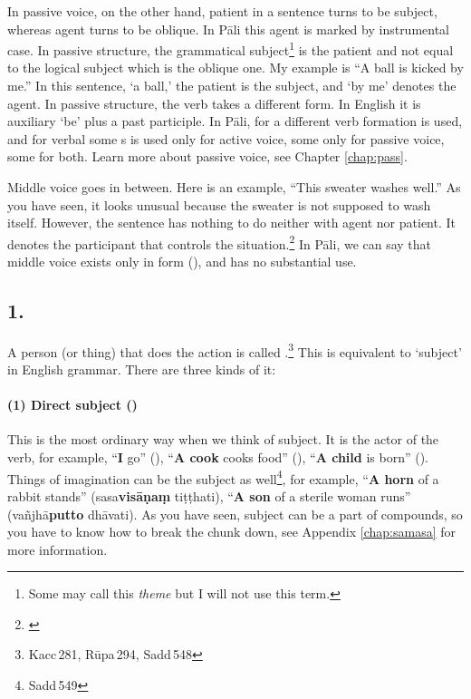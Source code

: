 In passive voice, on the other hand, patient in a sentence turns to be subject, whereas agent turns to be oblique. In P\=ali this agent is marked by instrumental case. In passive structure, the grammatical subject\footnote{Some may call this \emph{theme} but I will not use this term.} is the patient and not equal to the logical subject which is the oblique one. My example is ``A ball is kicked by me.'' In this sentence, `a ball,' the patient is the subject, and `by me' denotes the agent. In passive structure, the verb takes a different form. In English it is auxiliary `be' plus a past participle. In P\=ali, for  a different verb formation is used, and for verbal  some s is used only for active voice, some only for passive voice, some for both. Learn more about passive voice, see Chapter \ref{chap:pass}.

Middle voice goes in between. Here is an example, ``This sweater washes well.'' As you have seen, it looks unusual because the sweater is not supposed to wash itself. However, the sentence has nothing to do neither with agent nor patient. It denotes the participant that controls the situation.\footnote{\citealp[p.~467]{brownmiller:dict}} In P\=ali, we can say that middle voice exists only in form (), and has no substantial use.

{}
\subsection*{1.\,}

A person (or thing) that does the action is called .\footnote{Kacc\,281, R\=upa\,294, Sadd\,548} This is equivalent to `subject' in English grammar. There are three kinds of it:

\paragraph*{(1) Direct subject ()} This is the most ordinary way when we think of subject. It is the actor of the verb, for example, ``\textbf{I} go'' (), ``\textbf{A cook} cooks food'' (), ``\textbf{A child} is born'' (). Things of imagination can be the subject as well\footnote{Sadd\,549}, for example, ``\textbf{A horn} of a rabbit stands'' (sasa\textbf{vis\=a\d na\d m} ti\d t\d thati), ``\textbf{A son} of a sterile woman runs'' (va\~njh\=a\textbf{putto} dh\=avati). As you have seen, subject can be a part of compounds, so you have to know how to break the chunk down, see Appendix \ref{chap:samasa} for more information.

